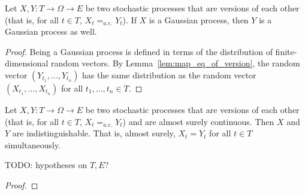 \begin{lemma}\label{lem:isGaussianProcess_of_version}
  \leanok
Let $X, Y : T \to \Omega \to E$ be two stochastic processes that are versions of each other (that is, for all $t \in T$, $X_t =_{a.e.} Y_t$).
If $X$ is a Gaussian process, then $Y$ is a Gaussian process as well.
\end{lemma}

\begin{proof}
Being a Gaussian process is defined in terms of the distribution of finite-dimensional random vectors.
By Lemma~\ref{lem:map_eq_of_version}, the random vector $(Y_{t_1}, \ldots, Y_{t_n})$ has the same distribution as the random vector $(X_{t_1}, \ldots, X_{t_n})$ for all $t_1, \ldots, t_n \in T$.
\end{proof}


\begin{lemma}\label{lem:indistinguishable_of_version_of_continuous}
Let $X, Y : T \to \Omega \to E$ be two stochastic processes that are versions of each other (that is, for all $t \in T$, $X_t =_{a.e.} Y_t$) and are almost surely continuous.
Then $X$ and $Y$ are indistinguishable. That is, almost surely, $X_t = Y_t$ for all $t \in T$ simultaneously.

TODO: hypotheses on $T, E$?
\end{lemma}

\begin{proof}

\end{proof}
